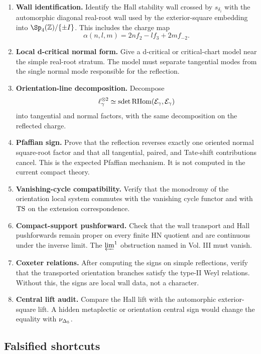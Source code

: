 \begin{enumerate}
\item \textbf{Wall identification.}  Identify the Hall stability wall
crossed by \(s_{\delta_i}\) with the automorphic diagonal real-root
wall used by the exterior-square embedding into
\(\Sp_4(\Z)/\{\pm I\}\).  This includes the charge map
\[
  \alpha(n,l,m)=2nf_2-lf_3+2mf_{-2}.
\]
\item \textbf{Local d-critical normal form.}  Give a d-critical or
critical-chart model near the simple real-root stratum.  The model must
separate tangential modes from the single normal mode responsible for
the reflection.
\item \textbf{Orientation-line decomposition.}  Decompose
\[
  \ell_\gamma^{\otimes2}
  \simeq
  \operatorname{sdet}\operatorname{RHom}(\mathcal E_\gamma,\mathcal E_\gamma)
\]
into tangential and normal factors, with the same decomposition on the
reflected charge.
\item \textbf{Pfaffian sign.}  Prove that the reflection reverses
exactly one oriented normal square-root factor and that all tangential,
paired, and Tate-shift contributions cancel.  This is the expected
Pfaffian mechanism.  It is not computed in the current compact theory.
\item \textbf{Vanishing-cycle compatibility.}  Verify that the
monodromy of the orientation local system commutes with the vanishing
cycle functor and with \(\mathrm{TS}\) on the extension correspondence.
\item \textbf{Compact-support pushforward.}  Check that the wall
transport and Hall pushforwards remain proper on every finite HN
quotient and are continuous under the inverse limit.  The
\(\varprojlim^1\) obstruction named in Vol. III must vanish.
\item \textbf{Coxeter relations.}  After computing the signs on simple
reflections, verify that the transported orientation branches satisfy
the type-II Weyl relations.  Without this, the signs are local wall
data, not a character.
\item \textbf{Central lift audit.}  Compare the Hall lift with the
automorphic exterior-square lift.  A hidden metaplectic or orientation
central sign would change the equality with \(\nu_{\Delta_5}\).
\end{enumerate}

\subsection{Falsified shortcuts}

